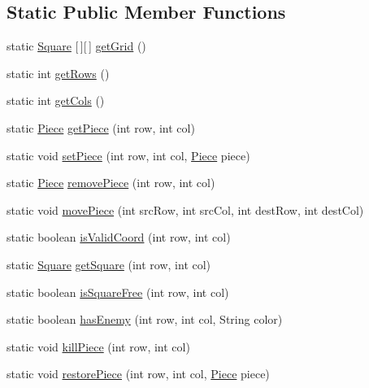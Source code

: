 \subsection*{Static Public Member Functions}
\begin{DoxyCompactItemize}
\item 
static \hyperlink{classmain_1_1_square}{Square} \mbox{[}$\,$\mbox{]}\mbox{[}$\,$\mbox{]} \hyperlink{classmain_1_1_board_ad9bdfe96594f8267aca15cafe03904ae}{get\+Grid} ()
\item 
static int \hyperlink{classmain_1_1_board_a59eccdf158ef8bcc6524a33363d0e529}{get\+Rows} ()
\item 
static int \hyperlink{classmain_1_1_board_a0a0733e45369c0f8e424e772d07fbc81}{get\+Cols} ()
\item 
static \hyperlink{classmain_1_1pieces_1_1_piece}{Piece} \hyperlink{classmain_1_1_board_ab9261be6958e2532a50ae8203ad134d0}{get\+Piece} (int row, int col)
\item 
static void \hyperlink{classmain_1_1_board_a215b7bab76f16b1c638bae367a5eed35}{set\+Piece} (int row, int col, \hyperlink{classmain_1_1pieces_1_1_piece}{Piece} piece)
\item 
static \hyperlink{classmain_1_1pieces_1_1_piece}{Piece} \hyperlink{classmain_1_1_board_a110748d6dfcc0e2bedce2053fb0c94b1}{remove\+Piece} (int row, int col)
\item 
static void \hyperlink{classmain_1_1_board_a5c62ecfe1552578c134322f291ce0d58}{move\+Piece} (int src\+Row, int src\+Col, int dest\+Row, int dest\+Col)
\item 
static boolean \hyperlink{classmain_1_1_board_aa6fcd07faec07bf9b093b3de3d96732c}{is\+Valid\+Coord} (int row, int col)
\item 
static \hyperlink{classmain_1_1_square}{Square} \hyperlink{classmain_1_1_board_a90e5f578ea61f42aa870d413176e1734}{get\+Square} (int row, int col)
\item 
static boolean \hyperlink{classmain_1_1_board_a425efbefafed1b93e1ddb92cbc914591}{is\+Square\+Free} (int row, int col)
\item 
static boolean \hyperlink{classmain_1_1_board_ade0a0da2dc83ac4bc025a2bdd42259fa}{has\+Enemy} (int row, int col, String color)
\item 
static void \hyperlink{classmain_1_1_board_a4faa6115089869b0dc2590ac45bb14b4}{kill\+Piece} (int row, int col)
\item 
static void \hyperlink{classmain_1_1_board_ac6cfd9f1f525312395d060f9491d4fc7}{restore\+Piece} (int row, int col, \hyperlink{classmain_1_1pieces_1_1_piece}{Piece} piece)

\end{DoxyCompactItemize}
